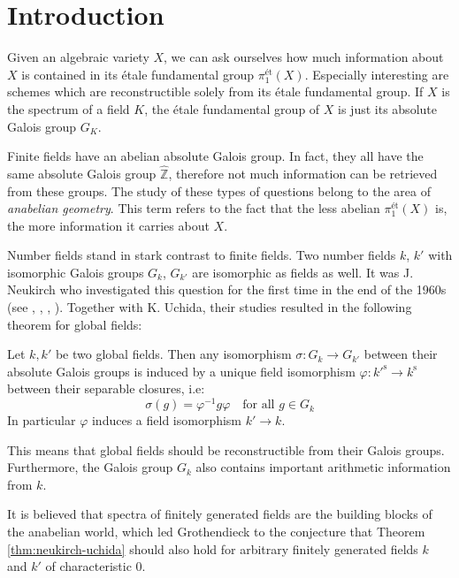 \chapter{Introduction}

Given an algebraic variety $X$, we can ask ourselves how much information about $X$ is contained in its étale fundamental group $\pi_1^{\text{ét}}(X)$. Especially interesting are schemes which are reconstructible solely from its étale fundamental group. If $X$ is the spectrum of a field $K$, the étale fundamental group of $X$ is just its absolute Galois group $G_K$. 

Finite fields have an abelian absolute Galois group. In fact, they all have the same absolute Galois group $\widehat{\mathbb{Z}}$, therefore not much information can be retrieved from these groups. The study of these types of questions belong to the area of \textit{anabelian geometry}. This term refers to the fact that the less abelian $\pi_1^\text{ét}(X)$ is, the more information it carries about $X$.

Number fields stand in stark contrast to finite fields. Two number fields $k$, $k'$ with isomorphic Galois groups $G_k$, $G_{k'}$ are isomorphic as fields as well. It was J. Neukirch who investigated this question for the first time in the end of the 1960s (see \cite{Ne69}, \cite{Uc76}, \cite{Ne77}, \cite{Uc77}). Together with K. Uchida, their studies resulted in the following theorem for global fields:

\begin{theorem}\label{thm:neukirch-uchida}
Let $k,k'$ be two global fields. Then any isomorphism $\sigma: G_k\to G_{k'}$ between their absolute Galois groups is induced by a unique field isomorphism $\varphi: k'^{\text{s}}\to k^\text{s}$ between their separable closures, i.e: 
\[\sigma(g) =\varphi^{-1}g\varphi \quad \text{for all }g\in G_k\] 
In particular $\varphi$ induces a field isomorphism $k'\to k$.
\end{theorem}

This means that global fields should be reconstructible from their Galois groups. Furthermore, the Galois group $G_k$ also contains important arithmetic information from $k$. 

It is believed that spectra of finitely generated fields are the building blocks of the anabelian world, which led Grothendieck to the conjecture that Theorem \ref{thm:neukirch-uchida} should also hold for arbitrary finitely generated fields $k$ and $k'$ of characteristic $0$.

